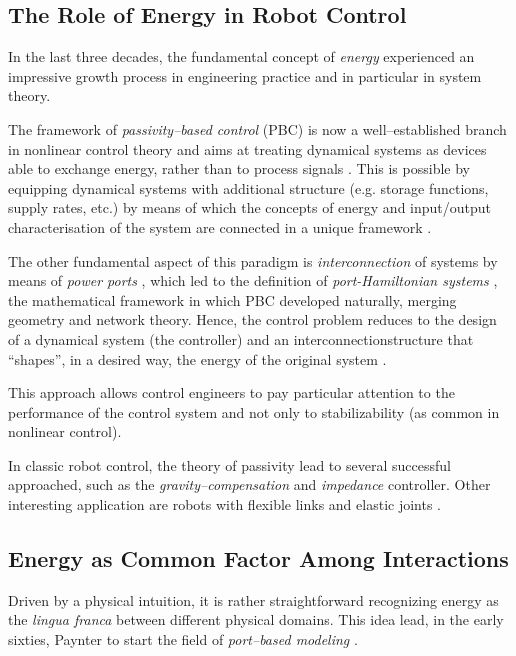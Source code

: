 \subsection{The Role of Energy in Robot Control}
In the last three decades, the fundamental concept of \textit{energy} experienced an impressive growth process in engineering practice and in particular in system theory. 
%
\newline

%
The framework of \textit{passivity--based control} (PBC) is now a well--established branch in nonlinear control theory and aims at treating dynamical systems as devices able to exchange energy, rather than to process signals \cite{ortega2001putting}. 
This is possible by equipping dynamical systems with additional structure (e.g. storage functions, supply rates, etc.) by means of which the concepts of energy and input/output characterisation of the system are connected in a unique framework \cite{sontag2008input}.
%
\newline

%
The other fundamental aspect of this paradigm is \textit{interconnection} of systems by means of \textit{power ports} \cite{duindam2009modeling}, which led to the definition of \textit{port-Hamiltonian systems} \cite{ortega2001putting,MASCHKE1992359,van2014port}, the mathematical framework in which PBC developed naturally, merging geometry and network theory. Hence, the control problem reduces to the design of a dynamical system (the controller) and an interconnectionstructure that ``shapes'', in a desired way, the energy of the original system \cite{ortega2001putting,ortega2008control}.
%
\newline

%
This approach allows control engineers to pay particular attention to the performance of the control system and not only to stabilizability (as common in nonlinear control).
%
\newline

%
In classic robot control, the theory of passivity lead to several successful approached, such as the \textit{gravity--compensation} \cite{arimoto1984stability} and \textit{impedance} controller. Other interesting application are robots with flexible links \cite{macchelli2009} and elastic joints \cite{zhang2016}.
%
\subsection{Energy as Common Factor Among Interactions}
%
Driven by a physical intuition, it is rather straightforward recognizing energy as the \textit{lingua franca} between different physical domains. This idea lead, in the early sixties, Paynter to start the field of \textit{port--based modeling} \cite{paynter1961analysis}.
%
\newline

